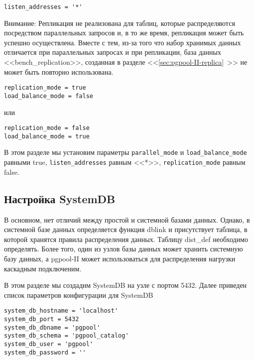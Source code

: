 \begin{lstlisting}[label=lst:pgpool23,caption=Настройка параллельного запроса]
listen_addresses = '*'
\end{lstlisting}

Внимание: Репликация не реализована для таблиц, которые распределяются посредством параллельных запросов и, в то же время, репликация может быть успешно осуществлена. Вместе с тем, из-за того что набор хранимых данных отличается при параллельных запросах и при репликации, база данных <<bench\_replication>>, созданная в разделе <<\ref{sec:pgpool-II-replica}~>> не может быть повторно использована.

\begin{lstlisting}[label=lst:pgpool24,caption=Настройка параллельного запроса]
replication_mode = true
load_balance_mode = false
\end{lstlisting}

или

\begin{lstlisting}[label=lst:pgpool25,caption=Настройка параллельного запроса]
replication_mode = false
load_balance_mode = true
\end{lstlisting}

В этом разделе мы установим параметры \lstinline!parallel_mode! и \lstinline!load_balance_mode! равными true, \lstinline!listen_addresses! равным <<*>>, \lstinline!replication_mode! равным false.


\subsection{Настройка SystemDB}

В основном, нет отличий между простой и системной базами данных. Однако, в системной базе данных определяется функция dblink и присутствует таблица, в которой хранятся правила распределения данных. Таблицу dist\_def необходимо определять. Более того, один из узлов базы данных может хранить системную базу данных, а pgpool-II может использоваться для распределения нагрузки каскадным подключеним.

В этом разделе мы создадим SystemDB на узле с портом 5432. Далее приведен список параметров конфигурации для SystemDB

\begin{lstlisting}[label=lst:pgpool26,caption=Настройка SystemDB]
system_db_hostname = 'localhost'
system_db_port = 5432
system_db_dbname = 'pgpool'
system_db_schema = 'pgpool_catalog'
system_db_user = 'pgpool'
system_db_password = ''
\end{lstlisting}

